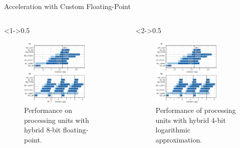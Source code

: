 \begin{frame}{Acceleration with Custom Floating-Point}
	\begin{columns}[c] %
		
		\begin{column}<1->{0.5\textwidth}
			\begin{figure}
				\includegraphics[width=0.75\textwidth]{../chapters/sbs_accelerator/figures/latency_cfp_cycle.pdf}
				\caption{\scriptsize Performance on processing units with hybrid 8-bit floating-point. }
			\end{figure}
		\end{column}
		
		\begin{column}<2->{0.5\textwidth}
			\begin{figure}
				\includegraphics[width=0.75\textwidth]{../chapters/sbs_accelerator/figures/latency_log_cycle.pdf}
				\caption{\scriptsize Performance of processing units with hybrid 4-bit logarithmic approximation.}
			\end{figure}
		\end{column}
		
	\end{columns}
\end{frame}

